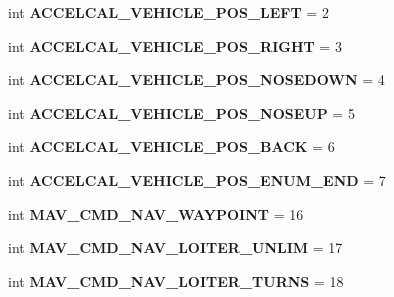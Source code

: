 \begin{DoxyCompactItemize}
int {\bfseries A\+C\+C\+E\+L\+C\+A\+L\+\_\+\+V\+E\+H\+I\+C\+L\+E\+\_\+\+P\+O\+S\+\_\+\+L\+E\+FT} = 2
\item 
\mbox{\label{namespacepymavlink_1_1dialects_1_1v10_a39ee7ab5c98e9d10058e61fa01079a60}} 
int {\bfseries A\+C\+C\+E\+L\+C\+A\+L\+\_\+\+V\+E\+H\+I\+C\+L\+E\+\_\+\+P\+O\+S\+\_\+\+R\+I\+G\+HT} = 3
\item 
\mbox{\label{namespacepymavlink_1_1dialects_1_1v10_af57b9d1468553b6f5bfc2110b03d395f}} 
int {\bfseries A\+C\+C\+E\+L\+C\+A\+L\+\_\+\+V\+E\+H\+I\+C\+L\+E\+\_\+\+P\+O\+S\+\_\+\+N\+O\+S\+E\+D\+O\+WN} = 4
\item 
\mbox{\label{namespacepymavlink_1_1dialects_1_1v10_ab4fceeffe5170b505354bd030510a660}} 
int {\bfseries A\+C\+C\+E\+L\+C\+A\+L\+\_\+\+V\+E\+H\+I\+C\+L\+E\+\_\+\+P\+O\+S\+\_\+\+N\+O\+S\+E\+UP} = 5
\item 
\mbox{\label{namespacepymavlink_1_1dialects_1_1v10_ab807ea686574dd581e6a0d781fdd2052}} 
int {\bfseries A\+C\+C\+E\+L\+C\+A\+L\+\_\+\+V\+E\+H\+I\+C\+L\+E\+\_\+\+P\+O\+S\+\_\+\+B\+A\+CK} = 6
\item 
\mbox{\label{namespacepymavlink_1_1dialects_1_1v10_a34f6a8e7ba7a61ef738ee4e136315c54}} 
int {\bfseries A\+C\+C\+E\+L\+C\+A\+L\+\_\+\+V\+E\+H\+I\+C\+L\+E\+\_\+\+P\+O\+S\+\_\+\+E\+N\+U\+M\+\_\+\+E\+ND} = 7
\item 
\mbox{\label{namespacepymavlink_1_1dialects_1_1v10_a24b607721f780e3a4c7d4a85de46eae4}} 
int {\bfseries M\+A\+V\+\_\+\+C\+M\+D\+\_\+\+N\+A\+V\+\_\+\+W\+A\+Y\+P\+O\+I\+NT} = 16
\item 
\mbox{\label{namespacepymavlink_1_1dialects_1_1v10_af9e88c12cc11675e9da5894880a5cee4}} 
int {\bfseries M\+A\+V\+\_\+\+C\+M\+D\+\_\+\+N\+A\+V\+\_\+\+L\+O\+I\+T\+E\+R\+\_\+\+U\+N\+L\+IM} = 17
\item 
\mbox{\label{namespacepymavlink_1_1dialects_1_1v10_a99d3122dc824aa389ad63a9394db8eb4}} 
int {\bfseries M\+A\+V\+\_\+\+C\+M\+D\+\_\+\+N\+A\+V\+\_\+\+L\+O\+I\+T\+E\+R\+\_\+\+T\+U\+R\+NS} = 18

\end{DoxyCompactItemize}

